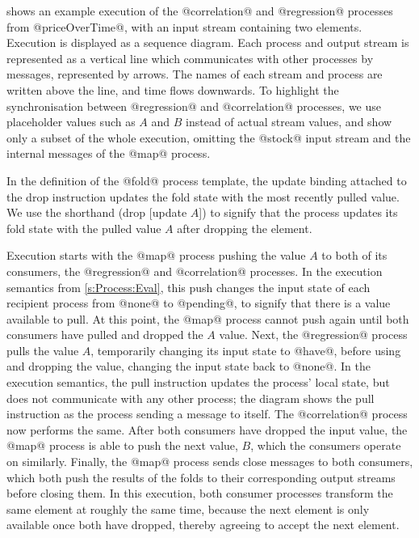  shows an example execution of the @correlation@ and @regression@ processes from @priceOverTime@, with an input stream containing two elements.
Execution is displayed as a sequence diagram.
Each process and output stream is represented as a vertical line which communicates with other processes by messages, represented by arrows.
The names of each stream and process are written above the line, and time flows downwards.
To highlight the synchronisation between @regression@ and @correlation@ processes, we use placeholder values such as $A$ and $B$ instead of actual stream values, and show only a subset of the whole execution, omitting the @stock@ input stream and the internal messages of the @map@ process.

In the definition of the @fold@ process template, the update binding attached to the drop instruction updates the fold state with the most recently pulled value.
We use the shorthand (drop [update $A$]) to signify that the process updates its fold state with the pulled value $A$ after dropping the element.

Execution starts with the @map@ process pushing the value $A$ to both of its consumers, the @regression@ and @correlation@ processes.
In the execution semantics from \cref{s:Process:Eval}, this push changes the input state of each recipient process from @none@ to @pending@, to signify that there is a value available to pull.
At this point, the @map@ process cannot push again until both consumers have pulled and dropped the $A$ value.
Next, the @regression@ process pulls the value $A$, temporarily changing its input state to @have@, before using and dropping the value, changing the input state back to @none@.
In the execution semantics, the pull instruction updates the process' local state, but does not communicate with any other process; the diagram shows the pull instruction as the process sending a message to itself.
The @correlation@ process now performs the same.
After both consumers have dropped the input value, the @map@ process is able to push the next value, $B$, which the consumers operate on similarly.
Finally, the @map@ process sends close messages to both consumers, which both push the results of the folds to their corresponding output streams before closing them.
In this execution, both consumer processes transform the same element at roughly the same time, because the next element is only available once both have dropped, thereby agreeing to accept the next element.


